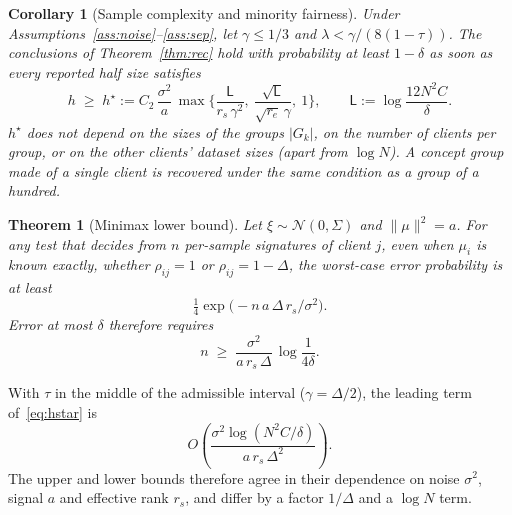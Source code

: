 \documentclass[pdflatex,sn-apa]{sn-jnl}
\theoremstyle{thmstyleone}
\newtheorem{theorem}{Theorem}
\newtheorem{corollary}{Corollary}
\theoremstyle{thmstylethree}
\begin{document}
\begin{corollary}[Sample complexity and minority fairness]\label{cor:sc}
Under Assumptions~\ref{ass:noise}--\ref{ass:sep}, let $\gamma\le1/3$ and $\lambda<\gamma/(8(1-\tau))$. The conclusions of Theorem~\ref{thm:rec} hold with probability at least $1-\delta$ as soon as every reported half size satisfies
\begin{equation}\label{eq:hstar}
h\;\ge\;h^\star:=C_2\,\frac{\sigma^2}{a}\,
\max\Big\{\frac{\mathsf L}{r_s\,\gamma^2},\ \frac{\sqrt{\mathsf L}}{\sqrt{r_e}\,\gamma},\ 1\Big\},
\qquad \mathsf L:=\log\frac{12N^2C}{\delta}.
\end{equation}
$h^\star$ does not depend on the sizes of the groups $|G_k|$, on the number of clients per group, or on the other clients' dataset sizes (apart from $\log N$). A concept group made of a \emph{single} client is recovered under the same condition as a group of a hundred.
\end{corollary}

\begin{theorem}[Minimax lower bound]\label{thm:lb}
Let $\xi\sim\mathcal N(0,\Sigma)$ and $\|\mu\|^2=a$. For any test that decides from $n$ per-sample signatures of client $j$, even when $\mu_i$ is known exactly, whether $\rho_{ij}=1$ or $\rho_{ij}=1-\Delta$, the worst-case error probability is at least
\[
\tfrac14\exp\!\big(-n\,a\,\Delta\,r_s/\sigma^2\big).
\]
Error at most $\delta$ therefore requires
\[
n\;\ge\;\frac{\sigma^2}{a\,r_s\,\Delta}\,\log\frac1{4\delta}.
\]
\end{theorem}
With $\tau$ in the middle of the admissible interval ($\gamma=\Delta/2$), the leading term of~\eqref{eq:hstar} is
\[
O\!\left(\frac{\sigma^2\log(N^2C/\delta)}{a\,r_s\,\Delta^2}\right).
\]
The upper and lower bounds therefore agree in their dependence on noise $\sigma^2$, signal $a$ and effective rank $r_s$, and differ by a factor $1/\Delta$ and a $\log N$ term.
\end{document}
